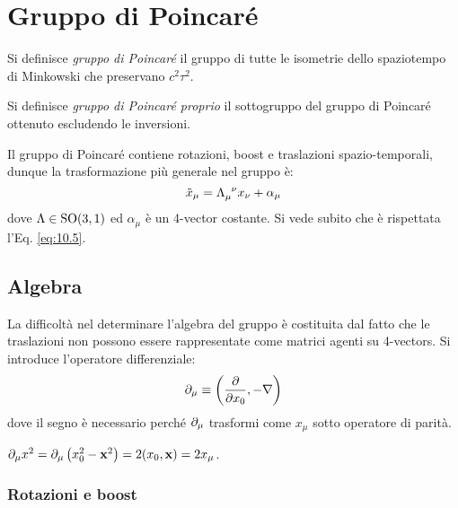 \section{Gruppo di Poincaré}

\begin{definition}
	Si definisce \textit{gruppo di Poincaré} il gruppo di tutte le isometrie dello spaziotempo di Minkowski che preservano $ c^2 \tau^2 $.
\end{definition}

\begin{definition}
	Si definisce \textit{gruppo di Poincaré proprio} il sottogruppo del gruppo di Poincaré ottenuto escludendo le inversioni.
\end{definition}

Il gruppo di Poincaré contiene rotazioni, boost e traslazioni spazio-temporali, dunque la trasformazione più generale nel gruppo è:
\begin{equation}
	\tilde{x}_{\mu} = \tensor{\Lambda}{_\mu^\nu} x_{\nu} + \alpha_{\mu}
	\label{eq:10.30}
\end{equation}
dove $ \Lambda \in \mathrm{SO}(3,1) $ ed $ \alpha_{\mu} $ è un 4-vector costante. Si vede subito che è rispettata l'Eq. \ref{eq:10.5}.

\subsection{Algebra}

La difficoltà nel determinare l'algebra del gruppo è costituita dal fatto che le traslazioni non possono essere rappresentate come matrici agenti su 4-vectors. Si introduce l'operatore differenziale:
\begin{equation}
	\partial_{\mu} \equiv \left( \frac{\partial}{\partial x_0}, -\nabla \right)
	\label{eq:10.31}
\end{equation}
dove il segno è necessario perché $ \partial_{\mu} $ trasformi come $ x_{\mu} $ sotto operatore di parità.

\begin{example}
	$ \partial_{\mu} x^2 = \partial_{\mu} \left( x_0^2 - \mathbf{x}^2 \right) = 2 (x_0, \mathbf{x}) = 2x_{\mu} $.
\end{example}

\subsubsection{Rotazioni e boost}

